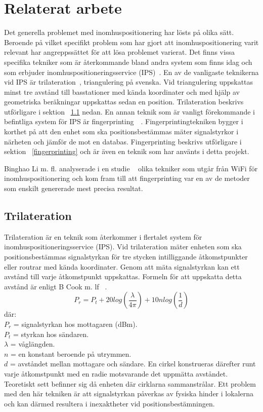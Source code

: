\documentclass[a4paper,12pt]{article}
\begin{document}
 \section{Relaterat arbete}
 Det generella problemet med inomhuspositionering har lösts på olika sätt.
 Beroende på vilket specifikt problem som har gjort att inomhuspositionering varit relevant har angreppssättet för att lösa problemet varierat. Det finns vissa specifika tekniker som är återkommande bland andra system som finns idag och som erbjuder inomhuspositioneringsservice (IPS)~\cite{IP1}.
 En av de vanligaste teknikerna vid IPS är trilateration~\cite{cook2005indoor}, triangulering på svenska. Vid triangulering uppskattas minst tre avstånd till basstationer med kända koordinater och med hjälp av geometriska beräkningar uppskattas sedan en position. Trilateration beskrivs utförligare i sektion ~\ref{triangulering}
  nedan. En annan teknik som är vanligt förekommande i befintliga system för IPS är fingerprinting~\cite{IP1}~\cite{jun2018low}. Fingerprintingtekniken bygger i korthet på att den enhet som ska positionsbestämmas mäter signalstyrkor i närheten och jämför de mot en databas. Fingerprinting beskrivs utförligare i sektion ~\ref{fingerprinting} och är även en teknik som har använts i detta projekt.

 Binghao Li m. fl. analyserade i en studie ~\cite{IP1} olika tekniker som utgår från WiFi för inomhuspositionering och kom fram till att fingerprinting var en av de metoder som enskilt genererade mest precisa resultat.


 \subsection{Trilateration}\label{triangulering}
 Trilateration är en teknik som återkommer i flertalet system för inomhuspositioneringsservice (IPS). Vid trilateration mäter enheten som ska positionsbestämmas signalstyrkan för tre stycken intilliggande åtkomstpunkter eller routrar med kända koordinater. Genom att mäta signalstyrkan kan ett avstånd till varje åtkomstpunkt uppskattas. Formeln för att uppskatta detta avstånd är enligt B Cook m. lf ~\cite{cook2005indoor}.
 \newline
 $$ P_r = P_t + 20log(\frac{\lambda}{4\pi}) + 10nlog(\frac{1}{d})$$
 där:\\
 $  P_r $ = signalstyrkan hos mottagaren (dBm).\\
 $P_t$ = styrkan hos sändaren.\\
 $\lambda$ = våglängden.\\
 $ n $ = en konstant beroende på utrymmen.\\
 $ d $ = avståndet mellan mottagare och sändare.
 \bigskip
 \newline
 En cirkel konstrueras därefter runt varje åtkomstpunkt med en radie motsvarande det uppmätta avståndet. Teoretiskt sett befinner sig då enheten där cirklarna sammanstrålar. Ett problem med den här tekniken är att signalstyrkan påverkas av fysiska hinder i lokalerna och kan därmed resultera i inexaktheter vid positionsbestämningen.
\end{document}
